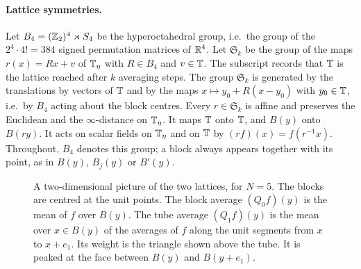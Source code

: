 \paragraph{Lattice symmetries.} Let $B_4=(\mathbb Z_2)^4\rtimes S_4$ be the hyperoctahedral group, i.e.\ the group of the $2^4\cdot4!=384$ signed permutation matrices of $\mathbb R^4$. Let $\mathfrak S_k$ be the group of the maps $r(x)=Rx+v$ of $\mathbb T_\eta$ with $R\in B_4$ and $v\in\mathbb T$. The subscript records that $\mathbb T$ is the lattice reached after $k$ averaging steps. The group $\mathfrak S_k$ is generated by the translations by vectors of $\mathbb T$ and by the maps $x\mapsto y_0+R(x-y_0)$ with $y_0\in\mathbb T$, i.e.\ by $B_4$ acting about the block centres. Every $r\in\mathfrak S_k$ is affine and preserves the Euclidean and the $\infty$-distance on $\mathbb T_\eta$. It maps $\mathbb T$ onto $\mathbb T$, and $B(y)$ onto $B(ry)$. It acts on scalar fields on $\mathbb T_\eta$ and on $\mathbb T$ by $(rf)(x)=f(r^{-1}x)$. Throughout, $B_4$ denotes this group; a block always appears together with its point, as in $B(y)$, $B_j(y)$ or $B'(y)$.

\begin{figure}[t]
\centering
{}
\caption{A two-dimensional picture of the two lattices, for $N=5$. The blocks are centred at the unit points. The block average $(Q_0f)(y)$ is the mean of $f$ over $B(y)$. The tube average $(Q_1f)(y)$ is the mean over $x\in B(y)$ of the averages of $f$ along the unit segments from $x$ to $x+e_1$. Its weight is the triangle shown above the tube. It is peaked at the face between $B(y)$ and $B(y+e_1)$.}
\label{fig:lattices}
\end{figure}

